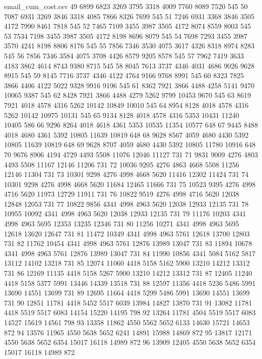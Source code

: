 \begin{filecontents*}{email_cum_cost.csv}
49	6899	6823	3269	3795	3318	4009	7760	8089	7520	545
50	7087	6931	3269	3846	3318	4085	7866	8326	7699	545
51	7246	6931	3368	3846	3505	4172	7990	8461	7818	545
52	7465	7109	3455	3987	3505	4172	8074	8559	8003	545
53	7534	7198	3455	3987	3505	4172	8198	8696	8079	545
54	7698	7293	3455	3987	3570	4241	8198	8806	8176	545
55	7856	7346	3530	4075	3617	4326	8318	8974	8283	545
56	7856	7346	3584	4075	3708	4426	8579	9205	8578	545
57	7962	7419	3633	4183	3862	4614	8743	9380	8715	545
58	8045	7613	3737	4346	4031	4686	9026	9628	8915	545
59	8145	7716	3737	4346	4122	4764	9166	9768	8991	545
60	8323	7825	3866	4406	4122	5022	9328	9916	9196	545
61	8362	7921	3866	4488	4258	5141	9470	10065	9387	545
62	8428	7921	3866	4488	4279	5262	9799	10453	9670	545
63	8619	7921	4018	4578	4316	5262	10142	10849	10010	545
64	8954	8128	4018	4578	4316	5262	10142	10975	10131	545
65	9134	8128	4018	4578	4316	5353	10431	11240	10405	586
66	9296	8264	4018	4618	4361	5353	10535	11354	10577	648
67	9445	8488	4018	4680	4361	5392	10805	11639	10819	648
68	9628	8567	4059	4680	4430	5392	10805	11639	10819	648
69	9628	8707	4059	4680	4430	5392	10805	11780	10916	648
70	9676	8906	4194	4729	4493	5508	11076	12046	11127	731
71	9831	9009	4276	4803	4493	5508	11167	12146	11206	731
72	10036	9205	4276	4863	4668	5508	11256	12146	11304	731
73	10301	9298	4276	4998	4668	5620	11416	12302	11424	731
74	10301	9298	4276	4998	4668	5620	11684	12465	11666	731
75	10523	9395	4276	4998	4716	5620	11973	12729	11911	731
76	10822	9519	4276	4998	4716	5620	12038	12848	12053	731
77	10822	9856	4341	4998	4963	5620	12038	12933	12135	731
78	10955	10092	4341	4998	4963	5620	12038	12933	12135	731
79	11176	10203	4341	4998	4963	5695	12353	13235	12346	731
80	11256	10271	4341	4998	4963	5695	12618	13620	12647	731
81	11472	10349	4341	4998	4963	5761	12618	13700	12803	731
82	11762	10454	4341	4998	4963	5761	12876	13989	13047	731
83	11894	10678	4341	4998	4963	5761	12876	13989	13047	731
84	11990	10856	4341	5084	5162	5817	13112	14102	13218	731
85	12074	11060	4418	5158	5162	5900	13210	14212	13312	731
86	12169	11135	4418	5158	5267	5900	13210	14212	13312	731
87	12405	11240	4418	5158	5377	5991	13446	14339	13518	731
88	12597	11356	4418	5236	5486	5991	13690	14551	13699	731
89	12695	11664	4418	5299	5486	5991	13690	14551	13699	731
90	12851	11781	4418	5452	5517	6039	13984	14827	13870	731
91	13082	11781	4418	5519	5517	6083	14154	15220	14195	798
92	13264	11781	4504	5519	5517	6083	14527	15619	14561	798
93	13358	11862	4550	5562	5652	6133	14630	15721	14653	872
94	13576	11965	4550	5638	5652	6241	14891	15988	14869	872
95	13817	12171	4550	5638	5652	6354	15017	16118	14989	872
96	13909	12405	4550	5638	5652	6354	15017	16118	14989	872

\end{filecontents*}
